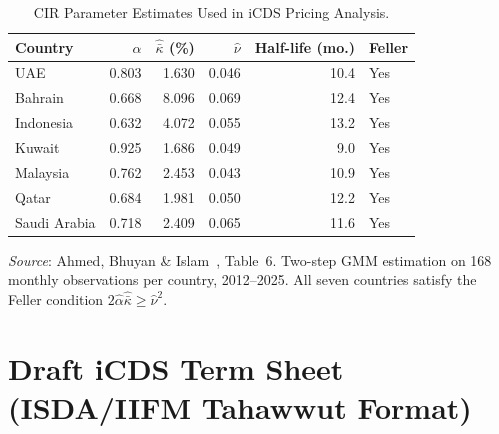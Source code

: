 \documentclass[12pt]{article}
\theoremstyle{plain}
\theoremstyle{definition}
\theoremstyle{remark}
\begin{document}
\begin{table}[htbp]
  \centering
  \caption{CIR Parameter Estimates Used in iCDS Pricing Analysis.}
  \label{tab:cir_params}
  \small
  \begin{tabular}{lrrrrl}
    \toprule
    Country & $\hat{\alpha}$ & $\hat{\bar{\kappa}}$ (\%) & $\hat{\nu}$ &
    Half-life (mo.) & Feller \\
    \midrule
    UAE          & 0.803 & 1.630 & 0.046 & 10.4 & Yes \\
    Bahrain      & 0.668 & 8.096 & 0.069 & 12.4 & Yes \\
    Indonesia    & 0.632 & 4.072 & 0.055 & 13.2 & Yes \\
    Kuwait       & 0.925 & 1.686 & 0.049 &  9.0 & Yes \\
    Malaysia     & 0.762 & 2.453 & 0.043 & 10.9 & Yes \\
    Qatar        & 0.684 & 1.981 & 0.050 & 12.2 & Yes \\
    Saudi Arabia & 0.718 & 2.409 & 0.065 & 11.6 & Yes \\
    \bottomrule
  \end{tabular}
  \begin{minipage}{\linewidth}
    \smallskip\footnotesize
    \textit{Source}: Ahmed, Bhuyan \& Islam~\cite{ABIa2026}, Table~6.
    Two-step GMM estimation on 168 monthly observations per country,
    2012--2025. All seven countries satisfy the Feller condition
    $2\hat{\alpha}\hat{\bar{\kappa}} \geq \hat{\nu}^2$.
  \end{minipage}
\end{table}

\section{Draft iCDS Term Sheet (ISDA/IIFM Tahawwut Format)}
\label{app:termsheet}
\end{document}
